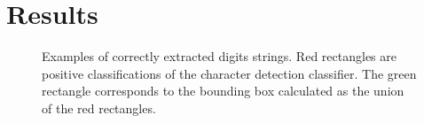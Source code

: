 \documentclass[11pt]{article}
\begin{document}
\section{Results}
\begin{figure}[ht]
    \centering
    \caption{Examples of correctly extracted digits strings. Red rectangles are positive classifications of the
    character detection classifier. The green rectangle corresponds to the bounding box calculated as the union
    of the red rectangles.}
    \label{fig:good_examples_pipeline}
\end{figure}
\end{document}
